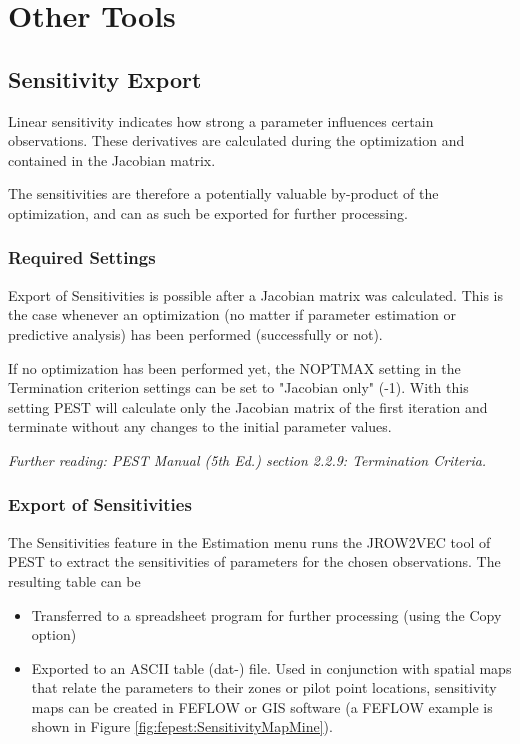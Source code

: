 \chapter{Other Tools}

\section{Sensitivity Export}
\label{sec:fepest:sensitivity}

Linear sensitivity indicates how strong a parameter influences certain observations. These derivatives are calculated during the optimization and contained in the Jacobian matrix.

The sensitivities are therefore a potentially valuable by-product of the optimization, and can as such be exported for further processing.

\subsection{Required Settings}

Export of Sensitivities is possible after a Jacobian matrix was calculated. This is the case whenever an optimization (no matter if parameter estimation or predictive analysis) has been performed (successfully or not).

If no optimization has been performed yet, the NOPTMAX setting in the Termination criterion settings can be set to "Jacobian only" (-1). With this setting PEST will calculate only the Jacobian matrix of the first iteration and terminate without any changes to the initial parameter values.

\textit{Further reading: PEST Manual (5th Ed.)
section 2.2.9: Termination Criteria.}


\subsection{Export of Sensitivities}

The Sensitivities feature in the Estimation menu runs the JROW2VEC tool of PEST to extract the sensitivities of parameters for the chosen observations. The resulting table can be 
\begin{itemize}
\item Transferred to a spreadsheet program for further processing (using the Copy option)
\item Exported to an ASCII table (dat-) file. Used in conjunction with spatial maps that relate the parameters to their zones or pilot point locations, sensitivity maps can be created in FEFLOW or GIS software (a FEFLOW example is shown in Figure \ref{fig:fepest:SensitivityMapMine}).
\end{itemize}

